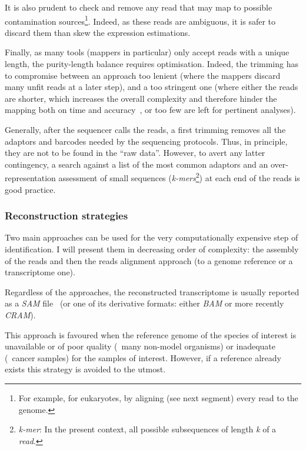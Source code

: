 It is also prudent to check and remove any read that may map to possible
contamination sources\footnote{For example, for eukaryotes, by aligning (see next
segment) every read to the  genome.}.
Indeed, as these reads are ambiguous, it is safer
to discard them than skew the expression estimations.\mybr\

Finally, as many tools (mappers in particular) only accept reads
with a unique length, the purity-length balance requires optimisation.
Indeed, the trimming has to compromise between
an approach too lenient (where the mappers discard many unfit reads at a later step),
and
a too stringent one (where either the reads are shorter,
which increases the overall complexity and therefore hinder
the mapping both on time and accuracy~,
or too few are left for pertinent analyses).\mybr\

Generally, after the sequencer calls the reads, a first trimming removes
all the adaptors and barcodes needed by the sequencing protocols. Thus,
in principle, they are not to be found in the \enquote{raw data}.
However, to avert any latter contingency, a search against
a list of the most common adaptors and an over-representation assessment of small
sequences (\emph{k-mers}\footnote{\emph{k-mer}: In the present context, all
possible subsequences of length
\emph{k} of a \emph{read}.}) at each end of the reads is good practice.\mybr\


\subsubsection{Reconstruction strategies}\label{subsec:reconstruction}

Two main approaches can be used for the very computationally expensive step of
identification. I will present them in decreasing order of complexity:
the  assembly of the reads and then the reads alignment approach
(to a genome reference or a transcriptome one).\mybr\

Regardless of the approaches, the reconstructed transcriptome is usually reported
as a \emph{\gls{SAM}} file~ (or one of its derivative formats:
either \emph{\gls{BAM}} or more recently \emph{CRAM}).\mybr\


This approach is favoured when the reference genome of the species of interest
is unavailable or of poor quality
(\eg\ many non-model organisms) or inadequate (\eg\ cancer samples)
for the samples of interest. However, if a reference already exists this strategy
is avoided to the utmost.\mybr\

